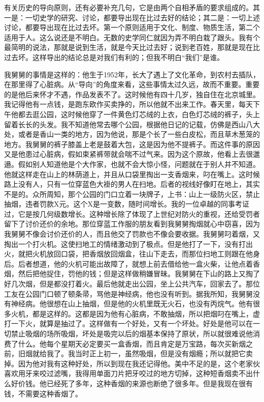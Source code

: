 有关历史的导向原则，还有必要补充几句，它是由两个自相矛盾的要求组成的。其一是：一切史学的研究、讨论，都要导出现在比过去好的结论；其二是：一切上述讨论，都要导出现在比过去坏。第一个原则适用于文化、制度、物质生活，第二个适用于人。这么说还是不明白。无数的史学同仁就因为弄不明白栽了跟头。我有个最简明的说法，那就是说到生活，就是今天比过去好；说到老百姓，那就是现在比过去坏。这样导出的结论总是对我们有利的；但我不明白“我们”是谁。 

我舅舅的事情是这样的：他生于1952年，长大了遇上了文化革命，到农村去插队，在那里得了心脏病。从“导向”的角度来看，这些事情太过久远，故而不重要。重要的是他后来怀才不遇，作品发表不了。这时候他有四十几岁，独自住在北京城里。我记得他有一点钱，是跑东欧作买卖挣的，所以他就不出来工作。春天里，每天下午他都去逛公园，这时候他穿了一件黄色灯芯绒的上衣，白色灯芯绒的裤子，头上留着长长的头发。我不知道他常去哪个公园，根据他日记的记载，仿佛是西山八大处，或者是香山一类的地方，因为他说，那是个长了一些白皮松，而且草木葱笼的地方。我舅舅的裤子膝盖上老是鼓着大包，这是因为他不提裤子。而这件事的原因又是他患过心脏病，假如束紧裤带就会喘不过气来。因为这个原故，他看上去很邋遢。假如别人知道他是个大作家，也就不会大惊小怪，问题就在于别人并不知道。他就这样走在山上的林荫道上，并且从口袋里掏出一支香烟来，叼在嘴上。这时候路上没有人，只有一位穿蓝色大褂的男人在扫地。后者的视线好像盯在地上，其实不是的。众所周知，那个公园的门口立着一块牌子，上书：山上一级防火区，禁止抽烟，违者罚款X元。这个X是一变数，随时间增长。我的一位卓越的同事考证过，它是按几何级数增长。这种增长除了体现了上世纪对防火的重视，还给受罚者留下了讨价还价的余地。那位穿蓝工作服的朋友看到我舅舅掏烟就心中窃喜，因为我舅舅不像会讨价还价的人，而且他交了罚款也不像会要收据。我舅舅叼着烟，又掏出一个打火机。这使扫地工的情绪激动到了极点。但是他打了一下，没有打出火，就把火机放回口袋，把香烟放回烟盒，往山下走去，而那位扫地工则跟在他身后。后者想道，他的火机可能出故障了，就想上前去借给他一盒火柴，让他点着香烟，然后把他捉住，罚他的钱；但是这样做稍嫌冒昧。我舅舅在下山的路上又掏了好几次烟，但是都没打着火。最后他就走出公园，坐上公共汽车，回家去了。那位工友在公园门口顿了顿条帚，骂他是神经病，他也没有听到。据我所知，我舅舅没有神经病。他很想在山上抽烟，但是他的火机里既无火石，也没有丙烷气。他有很多火机，都是这样的。这都是因为他有心脏病，不敢抽烟，所以把烟叼在嘴上，虚打一下火，就算是抽过了。这样做有一个好处，又有一个坏处。好处是他可以在一切禁止吸烟的场所吸烟，坏处是吸完以后的烟基本保持了原状，所以就很难说他消费了什么。他每个星期天必定要买一盒香烟，而且肯定是万宝路，每次买新烟之前，旧烟就给我了。我当时正上初一，虽然吸烟，但是没有烟瘾；所以就把它卖掉。因为他对我有这种好处，所以到现在我还记得他。美中不足的是，这个老家伙喜欢用牙来咬过滤嘴，我得用单面刀片把牙咬过的地方切掉，这种短香烟卖不出什么好价钱。他已经死了多年，这种香烟的来源也断绝了很多年。但是我现在很有钱，不需要这种香烟了。 

